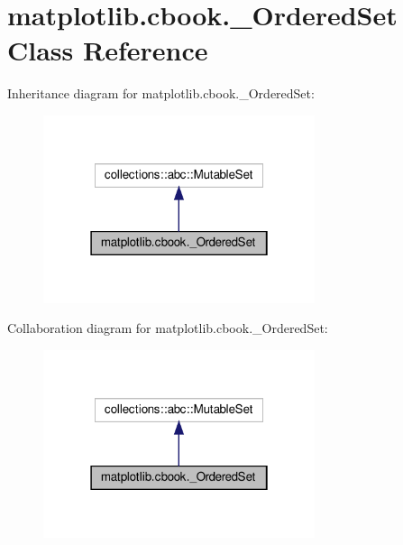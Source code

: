 \hypertarget{classmatplotlib_1_1cbook_1_1__OrderedSet}{}\section{matplotlib.\+cbook.\+\_\+\+Ordered\+Set Class Reference}
\label{classmatplotlib_1_1cbook_1_1__OrderedSet}


Inheritance diagram for matplotlib.\+cbook.\+\_\+\+Ordered\+Set\+:
\nopagebreak
\begin{figure}[H]
\begin{center}
\leavevmode
\includegraphics[width=226pt]{classmatplotlib_1_1cbook_1_1__OrderedSet__inherit__graph}
\end{center}
\end{figure}


Collaboration diagram for matplotlib.\+cbook.\+\_\+\+Ordered\+Set\+:
\nopagebreak
\begin{figure}[H]
\begin{center}
\leavevmode
\includegraphics[width=226pt]{classmatplotlib_1_1cbook_1_1__OrderedSet__coll__graph}
\end{center}
\end{figure}
